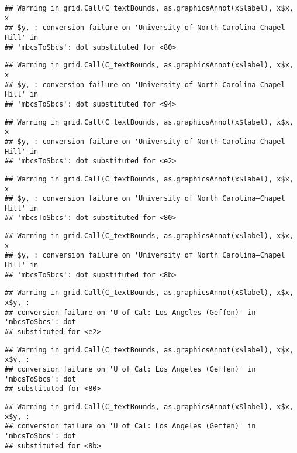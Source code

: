 \documentclass[]{article}
\begin{document}
\begin{verbatim}
## Warning in grid.Call(C_textBounds, as.graphicsAnnot(x$label), x$x, x
## $y, : conversion failure on 'University of North Carolina—​Chapel Hill' in
## 'mbcsToSbcs': dot substituted for <80>
\end{verbatim}

\begin{verbatim}
## Warning in grid.Call(C_textBounds, as.graphicsAnnot(x$label), x$x, x
## $y, : conversion failure on 'University of North Carolina—​Chapel Hill' in
## 'mbcsToSbcs': dot substituted for <94>
\end{verbatim}

\begin{verbatim}
## Warning in grid.Call(C_textBounds, as.graphicsAnnot(x$label), x$x, x
## $y, : conversion failure on 'University of North Carolina—​Chapel Hill' in
## 'mbcsToSbcs': dot substituted for <e2>
\end{verbatim}

\begin{verbatim}
## Warning in grid.Call(C_textBounds, as.graphicsAnnot(x$label), x$x, x
## $y, : conversion failure on 'University of North Carolina—​Chapel Hill' in
## 'mbcsToSbcs': dot substituted for <80>
\end{verbatim}

\begin{verbatim}
## Warning in grid.Call(C_textBounds, as.graphicsAnnot(x$label), x$x, x
## $y, : conversion failure on 'University of North Carolina—​Chapel Hill' in
## 'mbcsToSbcs': dot substituted for <8b>
\end{verbatim}

\begin{verbatim}
## Warning in grid.Call(C_textBounds, as.graphicsAnnot(x$label), x$x, x$y, :
## conversion failure on 'U of Cal: ​Los Angeles (Geffen)' in 'mbcsToSbcs': dot
## substituted for <e2>
\end{verbatim}

\begin{verbatim}
## Warning in grid.Call(C_textBounds, as.graphicsAnnot(x$label), x$x, x$y, :
## conversion failure on 'U of Cal: ​Los Angeles (Geffen)' in 'mbcsToSbcs': dot
## substituted for <80>
\end{verbatim}

\begin{verbatim}
## Warning in grid.Call(C_textBounds, as.graphicsAnnot(x$label), x$x, x$y, :
## conversion failure on 'U of Cal: ​Los Angeles (Geffen)' in 'mbcsToSbcs': dot
## substituted for <8b>
\end{verbatim}
\end{document}
